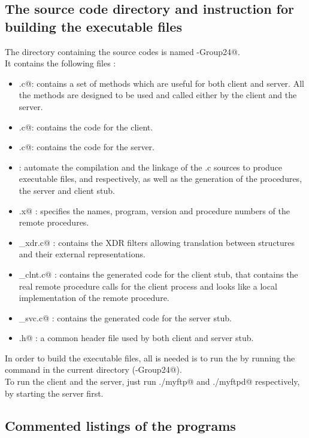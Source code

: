 \documentclass{article}
\begin{document}
\subsection{The source code directory and instruction for building the executable files}
The directory containing the source codes is named -Group24@.  \\
It contains the following files : 
\begin{itemize}
\item \verb@utils.c@: contains a set of methods which are useful for both client and server. All the methods are designed to be used and called either by the client and the server. 
\item \verb@myftp.c@: contains the code for the client.
\item \verb@myftpd.c@: contains the code for the server.
\item \verb@Makefile@: automate the compilation and the linkage of the .c sources to produce executable files, \verb@myftp@ and \verb@myftpd@ respectively, as well as the generation of the \verb@XDR@ procedures, the server and client stub.
\item \verb@rpspec.x@ : specifies the names, program, version and procedure numbers of the remote procedures.
\item \verb@rpspec_xdr.c@ : contains the XDR filters allowing translation between structures and their external representations.
\item \verb@rpspec_clnt.c@ : contains the generated code for the client stub, that contains the real remote procedure calls for the client process and looks like a local implementation of the remote procedure.
\item \verb@rpspec_svc.c@ : contains the generated code for the server stub.
\item \verb@rpspec.h@ : a common header file used by both client and server stub.
\end{itemize}
In order to build the executable files, all is needed is to run the \verb@Makefile@ by running the \verb@make@ command in the current directory (-Group24@).\\

To run the client and the server, just run \verb@./myftp@ and \verb@./myftpd@ respectively, by starting the server first.
\subsection{Commented listings of the programs}
\end{document}
